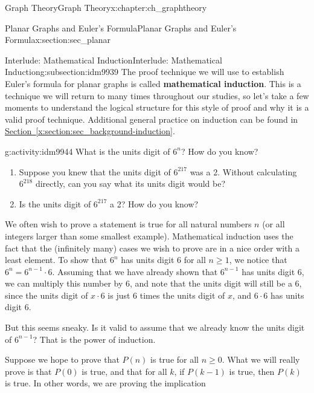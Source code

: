 \documentclass[oneside,10pt,]{book}
\newcommand{\terminology}[1]{\textbf{#1}}
\numberwithin{equation}{chapter}
\begin{document}
\begin{chapterptx}{Graph Theory}{}{Graph Theory}{}{}{x:chapter:ch_graphtheory}
\begin{sectionptx}{Planar Graphs and Euler's Formula}{}{Planar Graphs and Euler's Formula}{}{}{x:section:sec_planar}
%
%
\typeout{************************************************}
\typeout{************************************************}
%
\begin{subsectionptx}{Interlude: Mathematical Induction}{}{Interlude: Mathematical Induction}{}{}{g:subsection:idm9939}
The proof technique we will use to establish Euler's formula for planar graphs is called \terminology{mathematical induction}.  This is a technique we will return to many times throughout our studies, so let's take a few moments to understand the logical structure for this style of proof and why it is a valid proof technique.  Additional general practice on induction can be found in \hyperref[x:section:sec_background-induction]{Section~\ref{x:section:sec_background-induction}}.%
\begin{activity}{}{g:activity:idm9944}%
What is the units digit of \(6^n\)?  How do you know?%
\begin{enumerate}[font=\bfseries,label=(\alph*),ref=\alph*]
\item{}Suppose you knew that the units digit of \(6^{217}\) was a 2.  Without calculating \(6^{218}\) directly, can you say what its units digit would be?%
\item{}Is the units digit of \(6^{217}\) a 2?  How do you know?%
\end{enumerate}
\end{activity}
We often wish to prove a statement is true for all natural numbers \(n\) (or all integers larger than some smallest example).  Mathematical induction uses the fact that the (infinitely many) cases we wish to prove are in a nice order with a least element.  To show that \(6^n\) has units digit 6 for all \(n \ge 1\), we notice that \(6^n = 6^{n-1}\cdot 6\).  Assuming that we have already shown that \(6^{n-1}\) has units digit 6, we can multiply this number by 6, and note that the units digit will still be a 6, since the units digit of \(x \cdot 6\) is just 6 times the units digit of \(x\), and \(6\cdot 6\) has units digit 6.%
\par
But this seems sneaky.  Is it valid to assume that we already know the units digit of \(6^{n-1}\)?  That is the power of induction.%
\par
Suppose we hope to prove that \(P(n)\) is true for all \(n \ge 0\).  What we will really prove is that \(P(0)\) is true, and that for all \(k\), if \(P(k-1)\) is true, then \(P(k)\) is true.  In other words, we are proving the implication%
\begin{equation*}

\end{equation*}
\end{subsectionptx}
\end{sectionptx}
\end{chapterptx}
\end{document}
